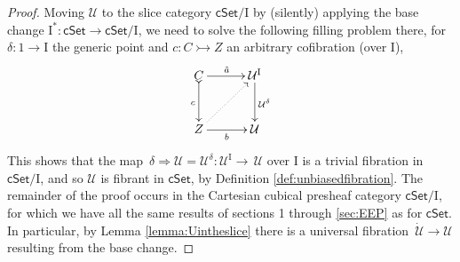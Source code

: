 \documentclass[12pt]{article}
\makeatletter
\newcommand{\cSet}{\ensuremath{\mathsf{cSet}}}
\newcommand{\ra}{\ensuremath{\rightarrow}}
\newcommand{\cof}{\ensuremath{\rightarrowtail}}
\renewcommand{\to}{\ensuremath{\rightarrow}}
\newcommand{\too}{\ensuremath{\longrightarrow}}
\newcommand{\I}{\ensuremath{\mathrm{I}}}
\newcommand{\U}{\ensuremath{\mathcal{U}}}
\newcommand{\UU}{\ensuremath{\,\dot{\mathcal{U}}}}
\theoremstyle{remark}
\theoremstyle{definition}
\newcommand{\pbcorner}[1][dr]{\save*!/#1-1.2pc/#1:(-1,1)@^{|-}\restore}
\makeatother
\begin{document}
%


\begin{proof}
Moving $\U$ to the slice category $\cSet/\I$ by  (silently) applying the base change $\I^*:\cSet\to\cSet/\I$, we need to solve the following filling problem there, for $\delta : 1 \to \I$ the generic point and  $c:C \cof Z$ an arbitrary cofibration (over $\I$),
\begin{equation}\label{diag:Ufib1}
\xymatrix@=3em{
C \ar@{>->}[d]_c \ar[r]^{\tilde{a}} & \U^\I \ar[d]^{\U^{\delta}} \\
Z  \ar@{..>}[ru] \ar[r]_{b}  & \U  \\
}
\end{equation}
This shows that the map $\,\delta \Rightarrow \U = \U^{\delta} : \U^\I \too\, \U$ over $\I$ is a trivial fibration in $\cSet/\I$, and so $\U$ is fibrant in $\cSet$, by Definition \ref{def:unbiasedfibration}.  The remainder of the proof occurs in the Cartesian cubical presheaf category $\cSet/\I$, for which we have all the same results of sections 1 through \ref{sec:EEP} as for $\cSet$.  In particular, by Lemma \ref{lemma:Uintheslice} there is a universal fibration $\UU\to\U$ resulting from the base change.  


\end{proof}
\end{document}

